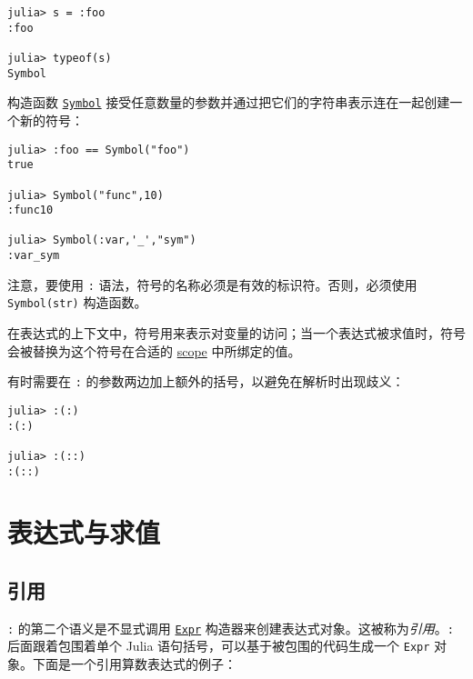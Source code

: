 \begin{verbatim}
julia> s = :foo
:foo

julia> typeof(s)
Symbol
\end{verbatim}



构造函数 \hyperlink{18332791376992528422}{\texttt{Symbol}} 接受任意数量的参数并通过把它们的字符串表示连在一起创建一个新的符号：




\begin{verbatim}
julia> :foo == Symbol("foo")
true

julia> Symbol("func",10)
:func10

julia> Symbol(:var,'_',"sym")
:var_sym
\end{verbatim}



注意，要使用 \texttt{:} 语法，符号的名称必须是有效的标识符。否则，必须使用 \texttt{Symbol(str)} 构造函数。



在表达式的上下文中，符号用来表示对变量的访问；当一个表达式被求值时，符号会被替换为这个符号在合适的 \hyperlink{11957539949537805757}{scope} 中所绑定的值。



有时需要在 \texttt{:} 的参数两边加上额外的括号，以避免在解析时出现歧义：




\begin{verbatim}
julia> :(:)
:(:)

julia> :(::)
:(::)
\end{verbatim}



\hypertarget{3051242913122022314}{}


\section{表达式与求值}



\hypertarget{12430289445905702597}{}


\subsection{引用}



\texttt{:} 的第二个语义是不显式调用 \hyperlink{17120496304147995299}{\texttt{Expr}} 构造器来创建表达式对象。这被称为\emph{引用}。\texttt{:} 后面跟着包围着单个 Julia 语句括号，可以基于被包围的代码生成一个 \texttt{Expr} 对象。下面是一个引用算数表达式的例子：




